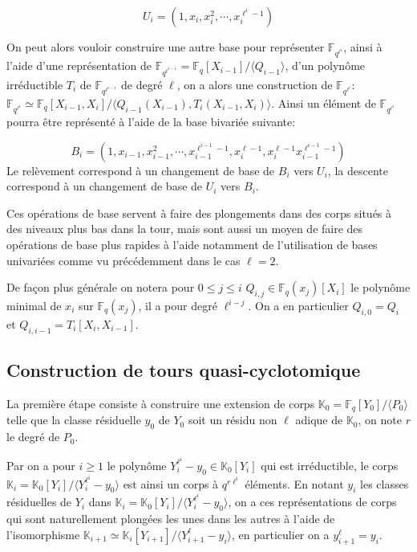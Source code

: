 \documentclass[10pt,a4paper]{book}
\theoremstyle{plain}
\theoremstyle{definition}
\theoremstyle{definition}
\theoremstyle{definition}
\theoremstyle{definition}
\theoremstyle{remark}
\theoremstyle{remark}
\begin{document}
\[
U_i=(1,x_i,x_i^2,\cdots,x_i^{\ell^i-1})
\]

On peut alors vouloir construire une autre base pour représenter $\mathbb{F}_{q^{\ell^i}}$, ainsi à l'aide d'une représentation de $\mathbb{F}_{q^{\ell^{i-1}}}=\mathbb{F}_q[X_{i-1}]/\langle Q_{i-1} \rangle $, d'un polynôme irréductible $T_{i}$ de $\mathbb{F}_{q^{\ell^{i-1}}}$ de degré $\ell$, on a alors une construction de $\mathbb{F}_{q^{\ell^i}}$: $\mathbb{F}_{q^{\ell^{i}}}\simeq \mathbb{F}_q[X_{i-1},X_{i}]/\langle Q_{i-1}(X_{i-1}), T_i(X_{i-1},X_{i}) \rangle $. Ainsi un élément de $\mathbb{F}_{q^{\ell^{i}}}$ pourra être représenté à l'aide de la base bivariée suivante:

\[
B_i=(1,x_{i-1},x_{i-1}^2,\cdots,x_{i-1}^{\ell^{i-1}-1},x_i^{\ell-1},x_i^{\ell-1}x_{i-1}^{\ell^{i-1}-1})
\] 
Le relèvement correspond à un changement de base de $B_i$ vers $U_i$, la descente correspond à un changement de base de $U_i$ vers $B_i$.

Ces opérations de base servent à faire des plongements dans des corps situés à des niveaux plus bas dans la tour, mais sont aussi un moyen de faire des opérations de base plus rapides à l'aide notamment de l'utilisation de bases univariées comme vu précédemment dans le cas $\ell=2$.

De façon plus générale on notera pour $0 \leqslant j \leqslant i $ $Q_{i,j} \in \mathbb{F}_q(x_j)[X_i]$ le polynôme minimal de $x_i$ sur $\mathbb{F}_{q}(x_j)$, il a pour degré $\ell^{i-j}$. On a en particulier $Q_{i,0}=Q_i$ et $Q_{i,i-1}=T_{i}[X_i,X_{i-1}]$.

\subsection{Construction de tours quasi-cyclotomique}
La première étape consiste à construire une extension de corps $\mathbb{K}_0=\mathbb{F}_q[Y_0]/\langle P_0 \rangle$ telle que la classe résiduelle $y_0$ de $Y_0$ soit un résidu non $\ell$ adique de $\mathbb{K}_0$, on note $r$ le degré de $P_0$.

Par \cite[Th. VI.9.1]{Lang2002algebra} on a pour $i \geqslant 1$ le polynôme $Y_i^{\ell^i}-y_0 \in \mathbb{K}_0[Y_i]$ qui est irréductible, le corps $\mathbb{K}_i=\mathbb{K}_0[Y_i]/\langle Y_i^{\ell^i}-y_0 \rangle$ est ainsi un corps à $q^{r\ell^i}$ éléments. En notant $y_i$ les classes résiduelles de $Y_i$ dans $\mathbb{K}_i=\mathbb{K}_0[Y_i]/\langle Y_i^{\ell^i}-y_0 \rangle$, on a ces représentations de corps qui sont naturellement plongées les unes dans les autres à l'aide de l'isomorphisme $\mathbb{K}_{i+1} \simeq \mathbb{K}_i[Y_{i+1}]/\langle Y_{i+1}^{\ell}-y_i\rangle $, en particulier on a $y_{i+1}^{\ell}=y_i$.
\end{document}
